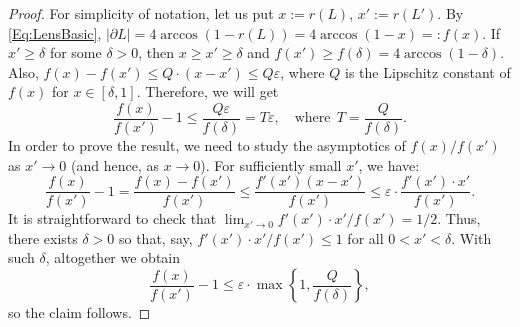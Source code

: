\documentclass[10pt,a4paper]{amsart}
\newcommand{\eps}{\varepsilon}
\renewcommand{\ge}{\geqslant}
\renewcommand{\le}{\leqslant}
\begin{document}
\begin{proof}
For simplicity of notation, let us put $x := r(L)$, $x' := r(L')$. By \eqref{Eq:LensBasic}, $|\partial L|  = 4 \arccos(1 - r(L)) = 4 \arccos(1 - x) =: f(x)$. If $x' \ge \delta$ for some $\delta > 0$, then $x \ge x' \ge \delta$ and $f(x') \ge f(\delta) = 4 \arccos(1 - \delta)$. Also, $f(x) - f(x') \le Q \cdot (x - x') \le Q \eps$, where $Q$ is the Lipschitz constant of $f(x)$ for $x \in [\delta, 1]$. Therefore, we will get
\[
\frac{f(x)}{f(x')} - 1 \le \frac{Q \eps}{f(\delta)} = T\eps, \quad \text{where}\ \  T= \frac{Q}{f(\delta)}.
\]
In order to prove the result, we need to study the asymptotics of $f(x)/f(x')$ as $x' \to 0$ (and hence, as $x \to 0$). For sufficiently small $x'$, we have:
\[
\frac{f(x)}{f(x')} - 1 = \frac{f(x) - f(x')}{f(x')} \le \frac{f'(x')(x-x')}{f(x')} \le \eps \cdot \frac{f'(x')\cdot x'}{f(x')}.
\]
It is straightforward to check that $\lim_{x' \to 0}{f'(x')\cdot x'}/{f(x')} = 1/2$. Thus, there exists $\delta > 0$ so that, say, ${f'(x')\cdot x'}/{f(x')} \le 1$ for all $0 < x' < \delta$. With such $\delta$, altogether we obtain
\[
\frac{f(x)}{f(x')} - 1 \le \eps \cdot \max \left\{1, \frac{Q}{f(\delta)}\right\},
\]
so the claim follows.
\end{proof}
\end{document}
